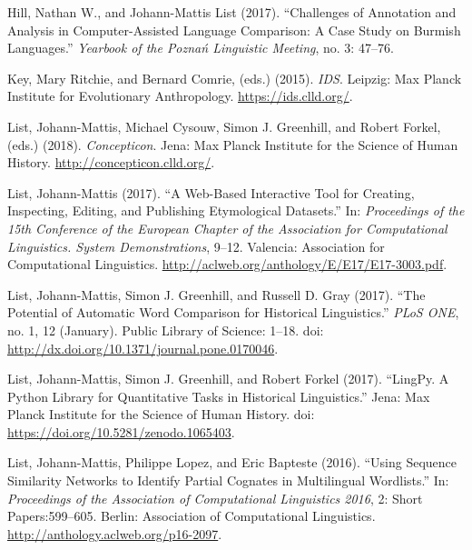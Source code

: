 \documentclass[
  a4paper,
  14pt,
  oneside,
  tablecaptionabove
]{scrbook}
\begin{document}
\nopagebreak\hangindent=0.7cm {\small Hill, Nathan W., and Johann-Mattis List (2017). \enquote{Challenges of
Annotation and Analysis in Computer-Assisted Language Comparison: A Case
Study on Burmish Languages.} \emph{Yearbook of the Poznań Linguistic
Meeting}, no. 3: 47--76. }

\nopagebreak\hangindent=0.7cm {\small Key, Mary Ritchie, and Bernard Comrie, (eds.) (2015). \emph{IDS}. 
Leipzig: Max Planck Institute for Evolutionary Anthropology.
\url{https://ids.clld.org/}.  }

\nopagebreak\hangindent=0.7cm {\small List, Johann-Mattis, Michael Cysouw, Simon J. Greenhill, and Robert
Forkel, (eds.) (2018). \emph{Concepticon}.  Jena: Max Planck Institute for
the Science of Human History. \url{http://concepticon.clld.org/}.  }

\nopagebreak\hangindent=0.7cm {\small List, Johann-Mattis (2017). \enquote{A Web-Based Interactive Tool for
Creating, Inspecting, Editing, and Publishing Etymological Datasets.} In:
\emph{Proceedings of the 15th Conference of the European Chapter of the
Association for Computational Linguistics. System Demonstrations},
9--12. Valencia: Association for Computational Linguistics.
\url{http://aclweb.org/anthology/E/E17/E17-3003.pdf}.  }

\nopagebreak\hangindent=0.7cm {\small List, Johann-Mattis, Simon J. Greenhill, and Russell D. Gray (2017).
\enquote{The Potential of Automatic Word Comparison for Historical
Linguistics.} \emph{PLoS ONE}, no. 1, 12 (January). Public Library of
Science: 1--18. doi:
\href{https://doi.org/http://dx.doi.org/10.1371/journal.pone.0170046}{http://dx.doi.org/10.1371/journal.pone.0170046}.
}

\nopagebreak\hangindent=0.7cm {\small List, Johann-Mattis, Simon J. Greenhill, and Robert Forkel (2017).
\enquote{LingPy. A Python Library for Quantitative Tasks in Historical
Linguistics.} Jena: Max Planck Institute for the Science of Human
History. doi:
\href{https://doi.org/https://doi.org/10.5281/zenodo.1065403}{https://doi.org/10.5281/zenodo.1065403}.
}

\nopagebreak\hangindent=0.7cm {\small List, Johann-Mattis, Philippe Lopez, and Eric Bapteste (2016).
\enquote{Using Sequence Similarity Networks to Identify Partial Cognates
in Multilingual Wordlists.} In: \emph{Proceedings of the Association of
Computational Linguistics 2016}, 2: Short Papers:599--605. Berlin:
Association of Computational Linguistics.
\url{http://anthology.aclweb.org/p16-2097}.  }
\end{document}
